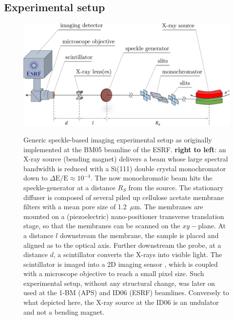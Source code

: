 \begin{refsection}
\subsection{Experimental setup}\label{sec:experimental_setup}

\begin{figure}[t]
        \centering
        {\includegraphics[width=0.7\linewidth]{figures/ch04/BM05.pdf}}
        \caption[Speckle-based imaging experimental setup at the BM05 beamline, ESRF.]{Generic speckle-based imaging experimental setup as originally implemented at the BM05 beamline of the ESRF. \textbf{right to left}: an X-ray source (bending magnet) delivers a beam whose large spectral bandwidth is reduced with a Si(111) double crystal monochromator down to $\Delta \text{E}/\text{E}\approx10^{-4}$. The now monochromatic beam hits the speckle-generator at a distance $R_S$ from the source. The stationary diffuser is composed of several piled up cellulose acetate membrane filters with a mean pore size of 1.2~$\mu$m. The membranes are mounted on a (piezoelectric) nano-positioner transverse translation stage, so that the membranes can be scanned on the $xy-$plane. At a distance $l$ downstream the membrane, the sample is placed and aligned as to the optical axis. Further downstream the probe, at a distance $d$, a scintillator converts the X-rays into visible light. The scintillator is imaged into a 2D imaging sensor , which is coupled with a microscope objective to reach a small pixel size. Such experimental setup, without any structural change, was later on used at the 1-BM (APS) and ID06 (ESRF) beamlines. Conversely to what depicted here, the X-ray source at the ID06 is an undulator and not a bending magnet.} \label{fig:BM05}
\end{figure}


\end{refsection}
